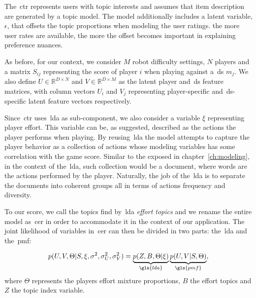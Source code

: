 The~\gls{ctr} represents users with topic interests and assumes that item description are generated by a topic model. The model additionally includes a latent variable, $\epsilon$, that offsets the topic proportions when modeling the user ratings. the more user rates are available, the more the offset becomes important in explaining preference nuances.

As before, for our context, we consider $M$ robot difficulty settings, $N$ players and a matrix $S_{ij}$ representing the score of player $i$ when playing against a~\gls{ds} $m_{j}$. We also define $U \in \mathbb{R}^{D\times N}$ and $V \in \mathbb{R}^{D\times M}$ as the latent player and~\gls{ds} feature matrices, with column vectors $U_i$ and $V_j$ representing player-specific and~\gls{ds}-specific latent feature vectors respectively. 

Since~\gls{ctr} uses~\gls{lda} as sub-component, we also consider a variable $\xi$ representing player effort. This variable can be, as suggested, described as the actions the player performs when playing. By reusing~\gls{lda} the model attempts to capture the player behavior as a collection of actions whose modeling variables has some correlation with the game score. Similar to the exposed in chapter~\ref{ch:modeling}, in the context of the~\gls{lda}, such collection would be a document, where words are the actions performed by the player. Naturally, the job of the~\gls{lda} is to separate the documents into coherent groups all in terms of actions frequency and diversity. 

To our score, we call the topics find by~\gls{lda} \textit{effort topics} and we rename the entire model as~\gls{cer} in order to accommodate it in the context of our application.
The joint likelihood of variables in~\gls{cer} can then be divided in two parts: the~\gls{lda} and the~\gls{pmf}:

\begin{equation}
    p(U,V,\Theta|S,\xi,\sigma^{2},\sigma_{U}^{2},\sigma_{V}^{2}) = \underbrace{p(Z,B, \Theta | \xi)}_{\gls{lda}} \underbrace{p(U,V|S,\Theta)}_{\gls{pmf}},
\end{equation}
where $\Theta$ represents the players effort mixture proportions, $B$ the effort topics and $Z$ the topic index variable. %

